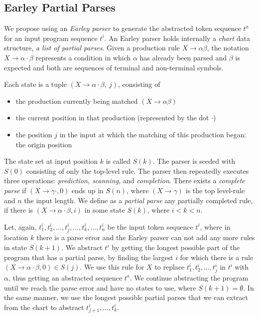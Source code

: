 \subsection{Earley Partial Parses}
\label{sec:prog-abstract:partial}

We propose using an \emph{Earley parser} to generate the abstracted token
sequence $t^a$ for an input program sequence $t^i$. An Earley parser holds
internally a \emph{chart} data structure, \ie \emph{a list of partial parses}.
Given a production rule $X \rightarrow \alpha \beta$, the notation $X
\rightarrow \alpha \cdot \beta$ represents a condition in which $\alpha$ has
already been parsed and $\beta$ is expected and both are sequences of terminal
and non-terminal symbols.

Each state is a tuple $(X \rightarrow \alpha \cdot \beta,\ j)$, consisting of
\begin{itemize}
    \item the production currently being matched $(X \rightarrow \alpha \beta)$
    \item the current position in that production (represented by the dot
    $\cdot$)
    \item the position $j$ in the input at which the matching of this production
    began: the origin position
\end{itemize}

The state set at input position $k$ is called $S(k)$. The parser is seeded with
$S(0)$ consisting of only the top-level rule. The parser then repeatedly
executes three operations: \emph{prediction, scanning,} and \emph{completion}.
There exists a \emph{complete parse} if $(X \rightarrow \gamma \cdot, 0)$ ends
up in $S(n)$, where $(X \rightarrow \gamma)$ is the top level-rule and $n$ the
input length. We define as a \emph{partial parse} any partially completed rule,
\ie if there is $(X \rightarrow \alpha \cdot \beta, i)$ in some state $S(k)$,
where $i < k < n$.

Let, again, $t^i_1, t^i_2, \dots, t^i_j, \dots, t^i_k, \dots, t^i_n$ be the
input token sequence $t^i$, where in location $k$ there is a parse error and the
Earley parser can not add any more rules in state $S(k + 1)$. We abstract $t^i$
by getting the longest possible part of the program that has a partial parse,
\ie by finding the largest $i$ for which there is a rule $(X \rightarrow \alpha
\cdot \beta, 0) \in S(j)$. We use this rule for $X$ to replace $t^i_1, t^i_2,
\dots, t^i_j$ in $t^i$ with $\alpha$, thus getting an abstracted sequence $t^a$.
We continue abstracting the program until we reach the parse error and have no
states to use, \ie where $S(k + 1) = \emptyset$. In the same manner, we use the
longest possible partial parses that we can extract from the chart to abstract
$t^i_{j+1}, \dots, t^i_k$.

